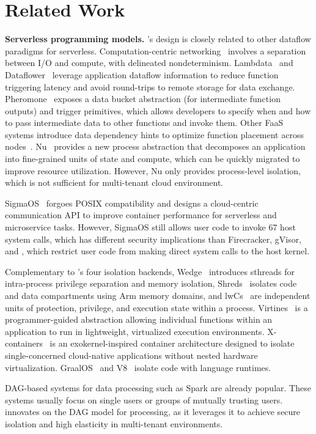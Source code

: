 \section{Related Work}\label{sec:relatedwork}

\textbf{Serverless programming models.} \dandelion's design is closely related to other dataflow paradigms for serverless. Computation-centric networking~\cite{compute-centric-networking} involves a separation between I/O and compute, with delineated nondeterminism. Lambdata~\cite{lambdata} and Dataflower~\cite{dataflower} leverage application dataflow information to reduce function triggering latency and avoid round-trips to remote storage for data exchange.
Pheromone~\cite{yu2023following} exposes a data bucket abstraction (for intermediate function outputs) and trigger primitives, which allows developers to specify when and how to pass intermediate data to other functions and invoke them. 
Other FaaS systems introduce data dependency hints to optimize function placement across nodes~\cite{abdi2023palette, mahgoub:sonic, faasflow}. 
Nu~\cite{nu-nsdi} provides a new process abstraction that decomposes an application into fine-grained units of state and compute, which can be quickly migrated to improve resource utilization. However, Nu only provides process-level isolation, which is not sufficient for multi-tenant cloud environment.

SigmaOS~\cite{sigmaos} forgoes POSIX compatibility and designs a cloud-centric communication API to improve container performance for serverless and microservice tasks. However, SigmaOS still allows user code to invoke 67 host system calls, which has different security implications than Firecracker, gVisor, and \dandelion, which restrict user code from making direct system calls to the host kernel.

Complementary to \dandelion's four isolation backends, Wedge~\cite{wedge-nsdi08} introduces sthreads for intra-process privilege separation and memory isolation, Shreds~\cite{shreds-security16} isolates code and data compartments using Arm memory domains, and lwCs~\cite{lwC-osdi16} are independent units of protection, privilege, and execution state within a process.
Virtines~\cite{virtines} is a programmer-guided abstraction allowing individual functions within an application to run in lightweight, virtualized execution environments. X-containers~\cite{x-containers} is an exokernel-inspired container architecture designed to isolate single-concerned cloud-native applications without nested hardware virtualization.
\mbox{GraalOS~\cite{graalos-serveless}} and V8~\cite{v8} isolate code with language runtimes.

DAG-based systems for data processing such as Spark\cite{spark} are already popular.
These systems usually focus on single users or groups of mutually trusting users. 
\dandelion innovates on the DAG model for processing, as it leverages it to achieve secure isolation and high elasticity in multi-tenant environments.
